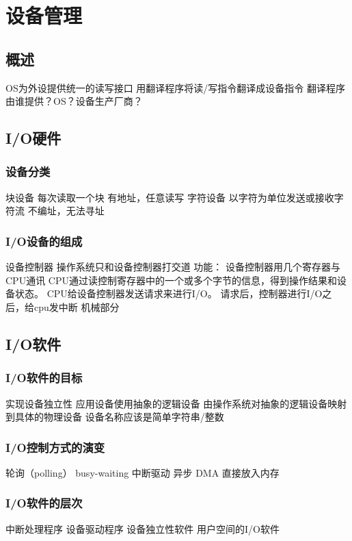 \documentclass{ctexart}
\begin{document}
\section{设备管理}
\subsection{概述}
\begin{outline}
    \1 OS为外设提供统一的读写接口
    \1 用翻译程序将读/写指令翻译成设备指令
    \1 翻译程序由谁提供？OS？设备生产厂商？
\end{outline}
\subsection{I/O硬件}
\subsubsection{设备分类}
\begin{outline}
    \1 块设备
        \2 每次读取一个块
        \2 有地址，任意读写
    \1 字符设备
        \2 以字符为单位发送或接收字符流
        \2 不编址，无法寻址
\end{outline}
\subsubsection{I/O设备的组成}
\begin{outline}
    \1 设备控制器
        \2 操作系统只和设备控制器打交道
        \2 功能：
            \3 设备控制器用几个寄存器与CPU通讯
            \3 CPU通过读控制寄存器中的一个或多个字节的信息，得到操作结果和设备状态。
            \3 CPU给设备控制器发送请求来进行I/O。
            \3 请求后，控制器进行I/O之后，给cpu发中断
    \1 机械部分
\end{outline}
\subsection{I/O软件}
\subsubsection{I/O软件的目标}
\begin{outline}
    \1 实现设备独立性
        \2 应用设备使用抽象的逻辑设备
        \2 由操作系统对抽象的逻辑设备映射到具体的物理设备
        \3 设备名称应该是简单字符串/整数
\end{outline}
\subsubsection{I/O控制方式的演变}
\begin{outline}
    \1 轮询（polling）
        \2 busy-waiting
    \1 中断驱动
        \2 异步
    \1 DMA
        \2 直接放入内存
\end{outline}
\subsubsection{I/O软件的层次}
\begin{outline}
    \1 中断处理程序
    \1 设备驱动程序
    \1 设备独立性软件
    \1 用户空间的I/O软件
\end{outline}
\end{document}
